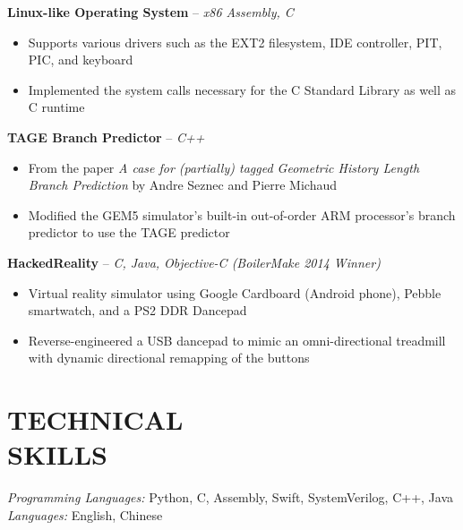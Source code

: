 \documentclass[resmargin]{res}
\begin{document}
\begin{resume}
	\vspace{-3mm}
	{\bf Linux-like Operating System} -- {\sl x86 Assembly, C} 
	\begin{itemize} \itemsep -1pt
	    \item Supports various drivers such as the EXT2 filesystem, IDE controller, PIT, PIC, and keyboard
	    \item Implemented the system calls necessary for the C Standard Library as well as C runtime
	\end{itemize}
	
	\vspace{-3mm}
	{\bf TAGE Branch Predictor} -- {\sl C++} 
	\begin{itemize} \itemsep -1pt
	    \item From the paper {\sl A case for (partially) tagged Geometric History Length Branch Prediction} by Andre Seznec and Pierre Michaud
	    \item Modified the GEM5 simulator's built-in out-of-order ARM processor's branch predictor to use the TAGE predictor
	\end{itemize}
	
	\vspace{-3mm}
	{\bf HackedReality} -- {\sl C, Java, Objective-C \hfill(BoilerMake 2014 Winner)}
	\begin{itemize} \itemsep -1pt
	    \item Virtual reality simulator using Google Cardboard (Android phone), Pebble smartwatch, and a PS2 DDR Dancepad
	    \item Reverse-engineered a USB dancepad to mimic an omni-directional treadmill with dynamic directional remapping of the buttons
	\end{itemize}

\vspace{-3mm}
\section{TECHNICAL \\ SKILLS} 
{\sl Programming Languages:} Python, C, Assembly, Swift, SystemVerilog, C++, Java\\
{\sl Languages:} English, Chinese

\end{resume}
\end{document}
